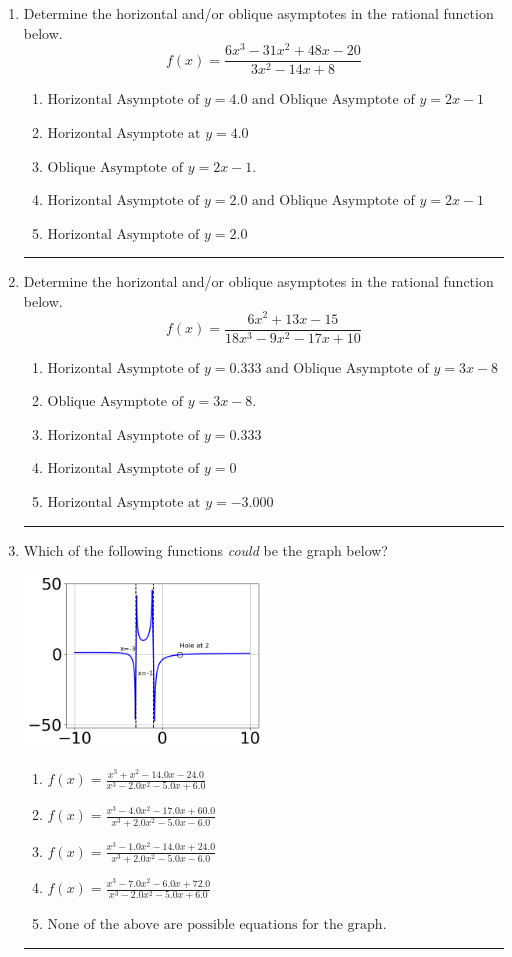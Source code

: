 \documentclass[14pt]{extbook}
\newcommand{\litem}[1]{\item#1\hspace*{-1cm}\rule{\textwidth}{0.4pt}}
\begin{document}
\begin{enumerate}
{\begin{enumerate}[label=\Alph*.]
\end{enumerate} }
\litem{
Determine the horizontal and/or oblique asymptotes in the rational function below.\[ f(x) = \frac{6x^{3} -31 x^{2} +48 x -20}{3x^{2} -14 x + 8} \]\begin{enumerate}[label=\Alph*.]
\item \( \text{Horizontal Asymptote of } y = 4.0 \text{ and Oblique Asymptote of } y = 2x -1 \)
\item \( \text{Horizontal Asymptote at } y = 4.0 \)
\item \( \text{Oblique Asymptote of } y = 2x -1. \)
\item \( \text{Horizontal Asymptote of } y = 2.0 \text{ and Oblique Asymptote of } y = 2x -1 \)
\item \( \text{Horizontal Asymptote of } y = 2.0  \)

\end{enumerate} }
\litem{
Determine the horizontal and/or oblique asymptotes in the rational function below.\[ f(x) = \frac{6x^{2} +13 x -15}{18x^{3} -9 x^{2} -17 x + 10} \]\begin{enumerate}[label=\Alph*.]
\item \( \text{Horizontal Asymptote of } y = 0.333 \text{ and Oblique Asymptote of } y = 3x -8 \)
\item \( \text{Oblique Asymptote of } y = 3x -8. \)
\item \( \text{Horizontal Asymptote of } y = 0.333  \)
\item \( \text{Horizontal Asymptote of } y = 0 \)
\item \( \text{Horizontal Asymptote at } y = -3.000 \)

\end{enumerate} }
\litem{
Which of the following functions \textit{could} be the graph below?
\begin{center}
    \includegraphics[width=0.5\textwidth]{../Figures/identifyGraphOfRationalFunctionCopyB.png}
\end{center}
\begin{enumerate}[label=\Alph*.]
\item \( f(x)=\frac{x^{3} + x^{2} -14.0 x -24.0}{x^{3} -2.0 x^{2} -5.0 x + 6.0} \)
\item \( f(x)=\frac{x^{3} -4.0 x^{2} -17.0 x + 60.0}{x^{3} +2.0 x^{2} -5.0 x -6.0} \)
\item \( f(x)=\frac{x^{3} -1.0 x^{2} -14.0 x + 24.0}{x^{3} +2.0 x^{2} -5.0 x -6.0} \)
\item \( f(x)=\frac{x^{3} -7.0 x^{2} -6.0 x + 72.0}{x^{3} -2.0 x^{2} -5.0 x + 6.0} \)
\item \( \text{None of the above are possible equations for the graph.} \)


\end{enumerate}}
\end{enumerate}
\end{document}
